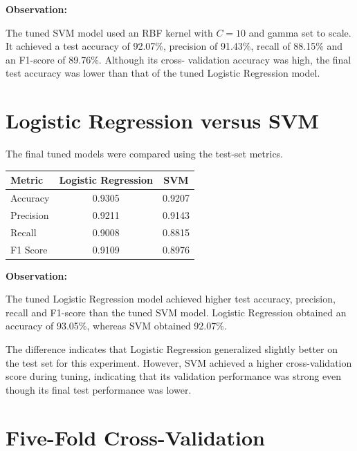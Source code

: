 \documentclass[12pt,a4paper]{article}
\begin{document}
\textbf{Observation:}

The tuned SVM model used an RBF kernel with $C=10$ and gamma set to
scale. It achieved a test accuracy of 92.07\%, precision of 91.43\%,
recall of 88.15\% and an F1-score of 89.76\%. Although its cross-
validation accuracy was high, the final test accuracy was lower than
that of the tuned Logistic Regression model.


\section{Logistic Regression versus SVM}

The final tuned models were compared using the test-set metrics.

\begin{longtable}{|p{5cm}|c|c|}
\hline
\textbf{Metric} &
\textbf{Logistic Regression} &
\textbf{SVM}
\\ \hline

Accuracy & 0.9305 & 0.9207 \\ \hline

Precision & 0.9211 & 0.9143 \\ \hline

Recall & 0.9008 & 0.8815 \\ \hline

F1 Score & 0.9109 & 0.8976 \\ \hline

\end{longtable}

\textbf{Observation:}

The tuned Logistic Regression model achieved higher test accuracy,
precision, recall and F1-score than the tuned SVM model. Logistic
Regression obtained an accuracy of 93.05\%, whereas SVM obtained
92.07\%.

The difference indicates that Logistic Regression generalized slightly
better on the test set for this experiment. However, SVM achieved a
higher cross-validation score during tuning, indicating that its
validation performance was strong even though its final test
performance was lower.


\section{Five-Fold Cross-Validation}
\end{document}
